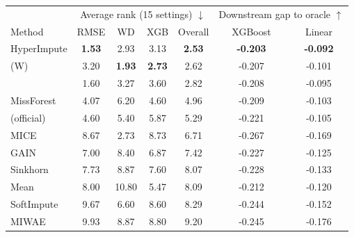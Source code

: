 \begin{tabular}{lcccc|cc}
\toprule
& \multicolumn{4}{c|}{Average rank (15 settings) $\downarrow$} & \multicolumn{2}{c}{Downstream gap to oracle $\uparrow$}\\
Method & RMSE & WD & XGB & Overall & XGBoost & Linear\\
\midrule
HyperImpute & \textbf{1.53} & 2.93 & 3.13 & \textbf{2.53} & \textbf{-0.203} & \textbf{-0.092}\\
\rmpp{} (W) & 3.20 & \textbf{1.93} & \textbf{2.73} & 2.62 & -0.207 & -0.101\\
\rmpp{} & 1.60 & 3.27 & 3.60 & 2.82 & -0.208 & -0.095\\
MissForest & 4.07 & 6.20 & 4.60 & 4.96 & -0.209 & -0.103\\
\remasker{} (official) & 4.60 & 5.40 & 5.87 & 5.29 & -0.221 & -0.105\\
MICE & 8.67 & 2.73 & 8.73 & 6.71 & -0.267 & -0.169\\
GAIN & 7.00 & 8.40 & 6.87 & 7.42 & -0.227 & -0.125\\
Sinkhorn & 7.73 & 8.87 & 7.60 & 8.07 & -0.228 & -0.133\\
Mean & 8.00 & 10.80 & 5.47 & 8.09 & -0.212 & -0.120\\
SoftImpute & 9.67 & 6.60 & 8.60 & 8.29 & -0.244 & -0.152\\
MIWAE & 9.93 & 8.87 & 8.80 & 9.20 & -0.245 & -0.176\\
\bottomrule
\end{tabular}
